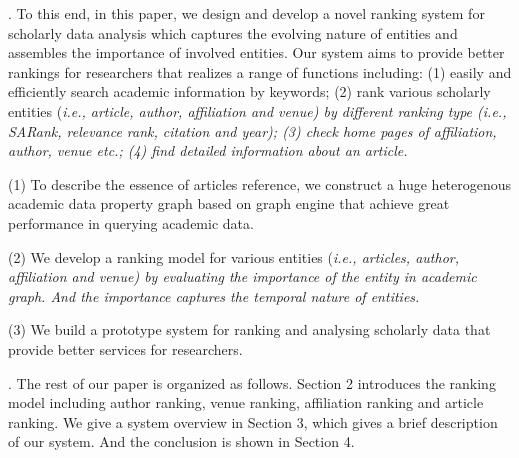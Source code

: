 





.
To this end, in this paper, we design and develop a novel ranking system for scholarly data analysis which captures the evolving nature of entities and assembles the importance of involved entities. Our system aims to provide better rankings for researchers that realizes a range of functions including: (1) easily and efficiently search academic information by keywords; (2) rank various scholarly entities (\itshape i.e., \upshape article, author, affiliation and venue) by different ranking type (\itshape i.e., \upshape SARank, relevance rank, citation and year); (3) check home pages of affiliation, author, venue  \itshape etc.\upshape ; (4) find detailed information about an article.

\noindent (1) To describe the essence of articles reference, we construct a huge heterogenous academic data property graph based on graph engine that achieve great performance in querying academic data.

\noindent (2) We develop a ranking model for various entities (\itshape i.e., \upshape articles, author, affiliation and venue) by evaluating the importance of the entity in academic graph. And the importance captures the temporal nature of entities.

\noindent (3) We build a prototype system for ranking and analysing scholarly data that provide better services for researchers.


.
The rest of our paper is organized as follows. Section 2 introduces the ranking model including author ranking, venue ranking, affiliation ranking and article ranking. We give a system overview in Section 3, which gives a brief description of our system. And the conclusion is shown in Section 4.
